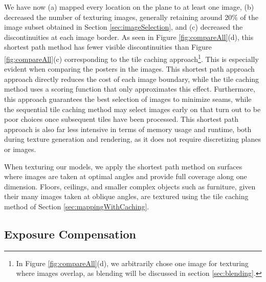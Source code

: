 \documentclass[]{spie}  %
\begin{document}
We have now (a) mapped every location on the plane to at least one
image, (b) decreased the number of texturing images, generally
retaining around 20\% of the image subset obtained in Section
\ref{sec:imageSelection}, and (c) decreased the discontinuities at
each image border. As seen in Figure \ref{fig:compareAll}(d), this
shortest path method has fewer visible discontinuities than Figure
\ref{fig:compareAll}(c) corresponding to the tile caching
approach\footnote{In Figure \ref{fig:compareAll}(d), we arbitrarily
  chose one image for texturing where images overlap, as blending will
  be discussed in section \ref{sec:blending}.}. This is especially
evident when comparing the posters in the images. This shortest path
approach approach directly reduces the cost of each image boundary,
while the tile caching method uses a scoring function that only
approximates this effect. Furthermore, this approach guarantees the
best selection of images to minimize seams, while the sequential tile
caching method may select images early on that turn out to be poor
choices once subsequent tiles have been processed. This shortest path
approach is also far less intensive in terms of memory usage and
runtime, both during texture generation and rendering, as it does not
require discretizing planes or images.

When texturing our models, we apply the shortest path method on
surfaces where images are taken at optimal angles and provide full
coverage along one dimension. Floors, ceilings, and smaller complex
objects such as furniture, given their many images taken at oblique
angles, are textured using the tile caching method of Section
\ref{sec:mappingWithCaching}.

\subsection{Exposure Compensation}
\label{sec:exposureCompensation}
\end{document}
